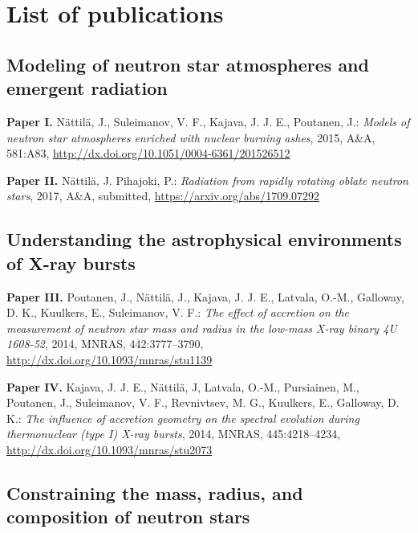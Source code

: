 \chapter*{List of publications}


\vspace{-0.3cm}
\section*{Modeling of neutron star atmospheres and emergent radiation}

\hspace{15pt}\textbf{Paper I.} Nättilä, J., Suleimanov, V. F., Kajava, J. J. E., Poutanen, J.:
\textit{Models of neutron star atmospheres enriched with nuclear burning ashes},
2015, A\&A, 581:A83, 
\url{http://dx.doi.org/10.1051/0004-6361/201526512}

\vspace{0.3cm}
\textbf{Paper II.} Nättilä, J. Pihajoki, P.: 
\textit{Radiation from rapidly rotating oblate neutron stars}, 
2017, A\&A, submitted, 
\url{https://arxiv.org/abs/1709.07292}



\vspace{0.3cm}
\section*{Understanding the astrophysical environments of X-ray bursts}

\hspace{15pt}\textbf{Paper III.} Poutanen, J., Nättilä, J., Kajava, J. J. E., Latvala, O.-M., Galloway, D. K., Kuulkers, E., Suleimanov, V. F.: 
\textit{The effect of accretion on the measurement of neutron star mass and radius in the low-mass X-ray binary 4U 1608-52}, 
2014, MNRAS, 442:3777–3790, 
\url{http://dx.doi.org/10.1093/mnras/stu1139}

\vspace{0.3cm}
\textbf{Paper IV.} Kajava, J. J. E., Nättilä, J, Latvala, O.-M., Pursiainen, M., Poutanen, J., Suleimanov, V. F., Revnivtsev, M. G., Kuulkers, E., Galloway, D. K.: 
\textit{The influence of accretion geometry on the spectral evolution during thermonuclear (type I) X-ray bursts}, 
2014, MNRAS, 445:4218–4234, 
\url{http://dx.doi.org/10.1093/mnras/stu2073}



\vspace{0.3cm}
\section*{Constraining the mass, radius, and composition of neutron stars}

